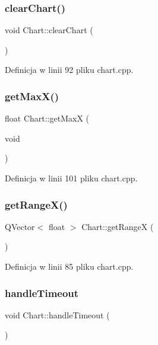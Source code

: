 \subsubsection{\texorpdfstring{clear\+Chart()}{clearChart()}}
{\footnotesize\ttfamily void Chart\+::clear\+Chart (\begin{DoxyParamCaption}{ }\end{DoxyParamCaption})}



Definicja w linii 92 pliku chart.\+cpp.

\mbox{\label{class_chart_aad8f606404a17c00bba777753203be7c}} 
\subsubsection{\texorpdfstring{get\+Max\+X()}{getMaxX()}}
{\footnotesize\ttfamily float Chart\+::get\+MaxX (\begin{DoxyParamCaption}\item[{void}]{ }\end{DoxyParamCaption})}



Definicja w linii 101 pliku chart.\+cpp.

\mbox{\label{class_chart_a741501f212ff1828286dbbe1bad94afd}} 
\subsubsection{\texorpdfstring{get\+Range\+X()}{getRangeX()}}
{\footnotesize\ttfamily Q\+Vector$<$ float $>$ Chart\+::get\+RangeX (\begin{DoxyParamCaption}{ }\end{DoxyParamCaption})}



Definicja w linii 85 pliku chart.\+cpp.

\mbox{\label{class_chart_aba07859ccb2630218a1e1d7b90c3f38c}} 
\subsubsection{\texorpdfstring{handle\+Timeout}{handleTimeout}}
{\footnotesize\ttfamily void Chart\+::handle\+Timeout (\begin{DoxyParamCaption}{ }\end{DoxyParamCaption})\hspace{0.3cm}{\ttfamily [slot]}}




